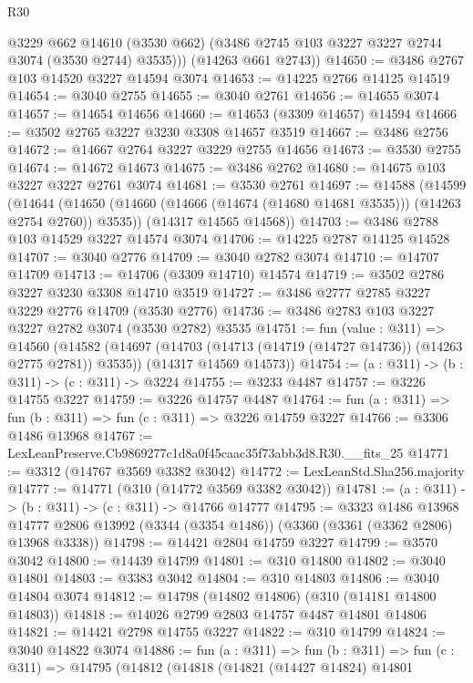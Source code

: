 \begin{lexlean}{R30}
\begin{coremodule}
          @3229
          @662
          @14610
          (@3530 @662)
          (@3486 @2745 @103 @3227 @3227 @2744 @3074 (@3530 @2744) @3535)))
      (@14263 @661 @2743))
@14650 := @3486 @2767 @103 @14520 @3227 @14594 @3074
@14653 := @14225 @2766 @14125 @14519
@14654 := @3040 @2755
@14655 := @3040 @2761
@14656 := @14655 @3074
@14657 := @14654 @14656
@14660 := @14653 (@3309 @14657) @14594
@14666 := @3502 @2765 @3227 @3230 @3308 @14657 @3519
@14667 := @3486 @2756
@14672 := @14667 @2764 @3227 @3229 @2755 @14656
@14673 := @3530 @2755
@14674 := @14672 @14673
@14675 := @3486 @2762
@14680 := @14675 @103 @3227 @3227 @2761 @3074
@14681 := @3530 @2761
@14697 := @14588
    (@14599
      (@14644 (@14650 (@14660 (@14666 (@14674 (@14680 @14681 @3535))) (@14263 @2754 @2760)) @3535))
      (@14317 @14565 @14568))
@14703 := @3486 @2788 @103 @14529 @3227 @14574 @3074
@14706 := @14225 @2787 @14125 @14528
@14707 := @3040 @2776
@14709 := @3040 @2782 @3074
@14710 := @14707 @14709
@14713 := @14706 (@3309 @14710) @14574
@14719 := @3502 @2786 @3227 @3230 @3308 @14710 @3519
@14727 := @3486 @2777 @2785 @3227 @3229 @2776 @14709 (@3530 @2776)
@14736 := @3486 @2783 @103 @3227 @3227 @2782 @3074 (@3530 @2782) @3535
@14751 := fun (value : @311) =>
  @14560
    (@14582
      (@14697 (@14703 (@14713 (@14719 (@14727 @14736)) (@14263 @2775 @2781)) @3535))
      (@14317 @14569 @14573))
@14754 := (a : @311) -> (b : @311) -> (c : @311) -> @3224
@14755 := @3233 @4487
@14757 := @3226 @14755 @3227
@14759 := @3226 @14757 @4487
@14764 := fun (a : @311) => fun (b : @311) => fun (c : @311) => @3226 @14759 @3227
@14766 := @3306 @1486 @13968
@14767 := LexLeanPreserve.Cb9869277c1d8a0f45caac35f73abb3d8.R30.__fits_25
@14771 := @3312 (@14767 @3569 @3382 @3042)
@14772 := LexLeanStd.Sha256.majority
@14777 := @14771 (@310 (@14772 @3569 @3382 @3042))
@14781 := (a : @311) -> (b : @311) -> (c : @311) -> @14766 @14777
@14795 := @3323
    @1486
    @13968
    @14777
    @2806
    @13992
    (@3344 (@3354 @1486))
    (@3360 (@3361 (@3362 @2806) @13968 @3338))
@14798 := @14421 @2804 @14759 @3227
@14799 := @3570 @3042
@14800 := @14439 @14799
@14801 := @310 @14800
@14802 := @3040 @14801
@14803 := @3383 @3042
@14804 := @310 @14803
@14806 := @3040 @14804 @3074
@14812 := @14798 (@14802 @14806) (@310 (@14181 @14800 @14803))
@14818 := @14026 @2799 @2803 @14757 @4487 @14801 @14806
@14821 := @14421 @2798 @14755 @3227
@14822 := @310 @14799
@14824 := @3040 @14822 @3074
@14886 := fun (a : @311) =>
  fun (b : @311) =>
  fun (c : @311) =>
  @14795
    (@14812
      (@14818
        (@14821
          (@14427 @14824)
          @14801

\end{coremodule}
\end{lexlean}
